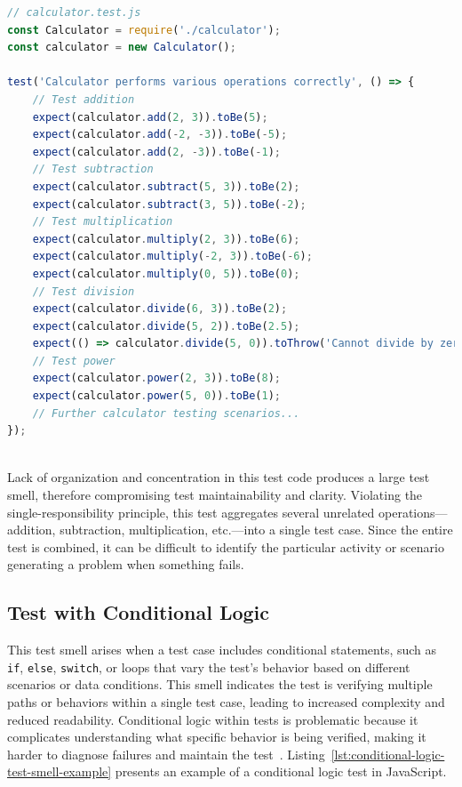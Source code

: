 \documentclass[
	msc, %
	english %
]{../ppgccufmg}
\begin{document}
        \begin{lstlisting}[language=javascript, caption= Large test smell example, label=lst:large-test-smell-example]
// calculator.test.js
const Calculator = require('./calculator');
const calculator = new Calculator();

test('Calculator performs various operations correctly', () => {
    // Test addition
    expect(calculator.add(2, 3)).toBe(5);
    expect(calculator.add(-2, -3)).toBe(-5);
    expect(calculator.add(2, -3)).toBe(-1);
    // Test subtraction
    expect(calculator.subtract(5, 3)).toBe(2);
    expect(calculator.subtract(3, 5)).toBe(-2);
    // Test multiplication
    expect(calculator.multiply(2, 3)).toBe(6);
    expect(calculator.multiply(-2, 3)).toBe(-6);
    expect(calculator.multiply(0, 5)).toBe(0);
    // Test division
    expect(calculator.divide(6, 3)).toBe(2);
    expect(calculator.divide(5, 2)).toBe(2.5);
    expect(() => calculator.divide(5, 0)).toThrow('Cannot divide by zero');
    // Test power
    expect(calculator.power(2, 3)).toBe(8);
    expect(calculator.power(5, 0)).toBe(1);
    // Further calculator testing scenarios...
});
        \end{lstlisting}
        ~\\[-2.0pt]

        Lack of organization and concentration in this test code produces a large test smell, therefore compromising test maintainability and clarity. Violating the single-responsibility principle, this test aggregates several unrelated operations—addition, subtraction, multiplication, etc.—into a single test case. Since the entire test is combined, it can be difficult to identify the particular activity or scenario generating a problem when something fails.
    
        \subsection{Test with Conditional Logic}\label{sec:ch2-test-smells-conditional-logic}

        This test smell arises when a test case includes conditional statements, such as \texttt{if}, \texttt{else}, \texttt{switch}, or loops that vary the test’s behavior based on different scenarios or data conditions. This smell indicates the test is verifying multiple paths or behaviors within a single test case, leading to increased complexity and reduced readability. Conditional logic within tests is problematic because it complicates understanding what specific behavior is being verified, making it harder to diagnose failures and maintain the test~\cite{beck2003,Meszaros2007,Valente24}. Listing~\ref{lst:conditional-logic-test-smell-example} presents an example of a conditional logic test in JavaScript.\\
\end{document}

